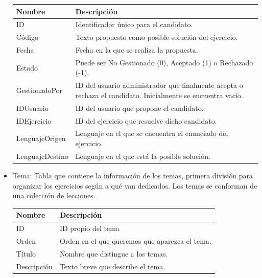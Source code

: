 \begin{itemize}
\begin{tabularx}{14cm}{|l|X|}
\hline
\textbf{Nombre} & \textbf{Descripción}                                                              \\ \hline
ID              & Identificador único para el candidato.                                         \\ \hline
Código        & Texto propuesto como posible solución del ejercicio. \\ \hline
Fecha      & Fecha en la que se realiza la propuesta. \\ \hline
Estado              & Puede ser No Gestionado (0), Aceptado (1) o Rechazado (-1).                                         \\ \hline
GestionadoPor        & ID del usuario administrador que finalmente acepta o rechaza el candidato. Inicialmente se encuentra vacío. \\ \hline
IDUsuario      & ID del usuario que propone el candidato. \\ \hline
IDEjercicio              & ID del ejercicio que resuelve dicho candidato.                                         \\ \hline
LenguajeOrigen        & Lenguaje en el que se encuentra el enunciado del ejercicio. \\ \hline
LenguajeDestino      & Lenguaje en el que está la posible solución. \\ \hline
\end{tabularx}
\vspace{1em}

\item Tema: Tabla que contiene la información de los temas, primera división para organizar los ejercicios según a qué van dedicados. Los temas se conforman de una colección de lecciones.

\begin{tabularx}{14cm}{|l|X|}
\hline
\textbf{Nombre} & \textbf{Descripción}                                                              \\ \hline
ID       & ID propio del tema                                                           \\ \hline
Orden     & Orden en el que queremos que aparezca el tema.                                           \\ \hline
Título            & Nombre que distingue a los temas. \\ \hline
Descripción            & Texto breve que describe el tema. \\ \hline
\end{tabularx}
\vspace{1em}


\end{itemize}
